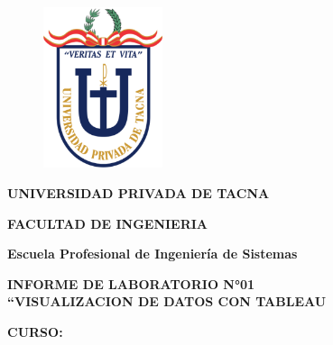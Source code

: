 \documentclass[12pt,letterpaper]{article}
\begin{document}
    \begin{titlepage}
        \begin{center}
            \begin{figure}[htb]
                \begin{center}
                    \includegraphics[width=3.5cm]{./img/logo}
                \end{center}
            \end{figure}
            \vspace*{0.15in}
            \begin{Large}
                \textbf{UNIVERSIDAD PRIVADA DE TACNA}\\
            \end{Large}
            \vspace*{0.15in}
            \begin{Large}
                \textbf{FACULTAD DE INGENIERIA} \\
            \end{Large}
            \vspace*{0.1in}
            \begin{Large}
                \textbf{Escuela Profesional de Ingeniería de Sistemas} \\
            \end{Large}
            \vspace*{0.3in}
            \begin{Large}
                \textbf{INFORME DE LABORATORIO N°01}\\
                \textbf{“VISUALIZACION DE DATOS CON TABLEAU}\\
            \end{Large}
            \vspace*{0.2in}
            \begin{Large}
                \textbf{CURSO:} \\
            \end{Large}
            \vspace*{0.1in}
            \begin{large}

\end{large}
\end{center}
\end{titlepage}
\end{document}

